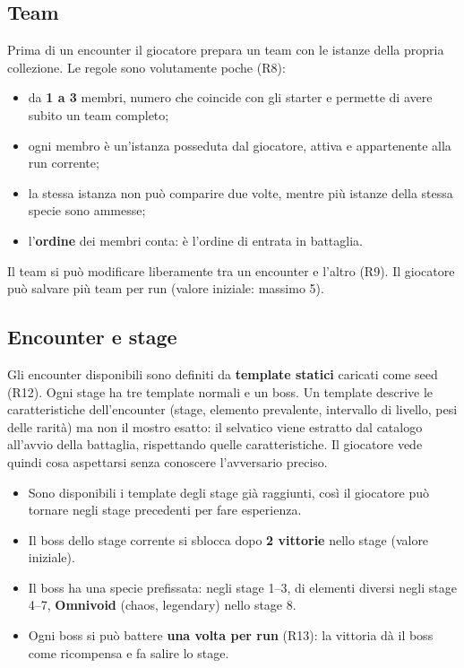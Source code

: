 \documentclass[11pt,a4paper]{article}
\begin{document}
\subsection{Team}

Prima di un encounter il giocatore prepara un team con le istanze della propria collezione. Le regole sono volutamente poche (R8):
\begin{itemize}
  \item da \textbf{1 a 3} membri, numero che coincide con gli starter e permette di avere subito un team completo;
  \item ogni membro è un'istanza posseduta dal giocatore, attiva e appartenente alla run corrente;
  \item la stessa istanza non può comparire due volte, mentre più istanze della stessa specie sono ammesse;
  \item l'\textbf{ordine} dei membri conta: è l'ordine di entrata in battaglia.
\end{itemize}
Il team si può modificare liberamente tra un encounter e l'altro (R9). Il giocatore può salvare più team per run (valore iniziale: massimo 5).

\subsection{Encounter e stage}

Gli encounter disponibili sono definiti da \textbf{template statici} caricati come seed (R12). Ogni stage ha tre template normali e un boss. Un template descrive le caratteristiche dell'encounter (stage, elemento prevalente, intervallo di livello, pesi delle rarità) ma non il mostro esatto: il selvatico viene estratto dal catalogo all'avvio della battaglia, rispettando quelle caratteristiche. Il giocatore vede quindi cosa aspettarsi senza conoscere l'avversario preciso.

\begin{itemize}
  \item Sono disponibili i template degli stage già raggiunti, così il giocatore può tornare negli stage precedenti per fare esperienza.
  \item Il boss dello stage corrente si sblocca dopo \textbf{2 vittorie} nello stage (valore iniziale).
  \item Il boss ha una specie prefissata:  negli stage 1–3,  di elementi diversi negli stage 4–7, \textbf{Omnivoid} (chaos, legendary) nello stage 8.
  \item Ogni boss si può battere \textbf{una volta per run} (R13): la vittoria dà il boss come ricompensa e fa salire lo stage.
\end{itemize}
\end{document}
